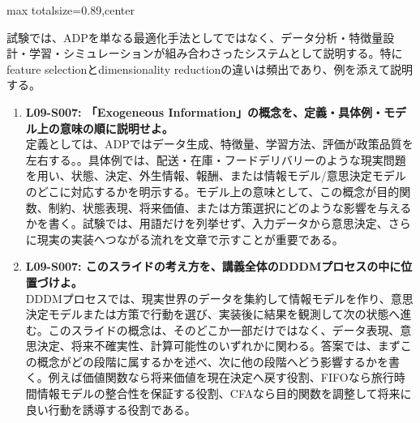 \begin{minipage}[t]{0.58\textwidth}
\begin{adjustbox}{max totalsize={\textwidth}{0.89\textheight},center}
\begin{minipage}{\textwidth}
試験では、ADPを単なる最適化手法としてではなく、データ分析・特徴量設計・学習・シミュレーションが組み合わさったシステムとして説明する。特にfeature selectionとdimensionality reductionの違いは頻出であり、例を添えて説明する。\par{}\begin{enumerate}\item \textbf{L09-S007: 「Exogeneous Information」の概念を、定義・具体例・モデル上の意味の順に説明せよ。}\\定義としては、ADPではデータ生成、特徴量、学習方法、評価が政策品質を左右する。。具体例では、配送・在庫・フードデリバリーのような現実問題を用い、状態、決定、外生情報、報酬、または情報モデル/意思決定モデルのどこに対応するかを明示する。モデル上の意味として、この概念が目的関数、制約、状態表現、将来価値、または方策選択にどのような影響を与えるかを書く。試験では、用語だけを列挙せず、入力データから意思決定、さらに現実の実装へつながる流れを文章で示すことが重要である。\item \textbf{L09-S007: このスライドの考え方を、講義全体のDDDMプロセスの中に位置づけよ。}\\DDDMプロセスでは、現実世界のデータを集約して情報モデルを作り、意思決定モデルまたは方策で行動を選び、実装後に結果を観測して次の状態へ進む。このスライドの概念は、そのどこか一部だけではなく、データ表現、意思決定、将来不確実性、計算可能性のいずれかに関わる。答案では、まずこの概念がどの段階に属するかを述べ、次に他の段階へどう影響するかを書く。例えば価値関数なら将来価値を現在決定へ戻す役割、FIFOなら旅行時間情報モデルの整合性を保証する役割、CFAなら目的関数を調整して将来に良い行動を誘導する役割である。\end{enumerate}
\end{minipage}
\end{adjustbox}
\end{minipage}


